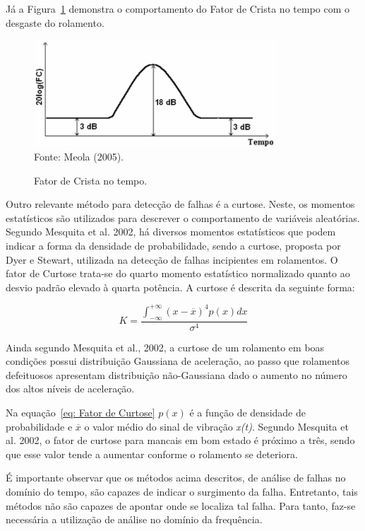 \documentclass[
	12pt,				
	oneside,			
	a4paper,			
	english,			
	brazil,	
	sumario=abnt-6027-2012		
	]{abntex2ppgsi}
\begin{document}
Já a Figura~\ref{FatorCrista} demonstra o comportamento do Fator de Crista no tempo com o desgaste do rolamento.

\begin{figure}[!htb]
\centering
\caption {Fator de Crista no tempo.}
\includegraphics[width=\textwidth,height=40mm,keepaspectratio]{Figura19} \\
Fonte: Meola (2005).
\label{FatorCrista}
\end{figure}	

Outro relevante método para detecção de falhas é a curtose. Neste, os momentos estatísticos são utilizados para descrever o comportamento de variáveis aleatórias. Segundo Mesquita et al. 2002, há diversos momentos estatísticos que podem indicar a forma da densidade de probabilidade, sendo a curtose, proposta por Dyer e Stewart, utilizada na detecção de falhas incipientes em rolamentos. O fator de Curtose trata-se do quarto momento estatístico normalizado quanto ao desvio padrão elevado à quarta potência. A curtose é descrita da seguinte forma:

\begin{equation}
	K = \frac{ \int_{-\infty}^{+\infty} (x - \overline{x})^{4}p(x)dx } {\sigma^{4}}
	\label{eq: Fator de Curtose}
\end{equation}

Ainda segundo Mesquita et al., 2002, a curtose de um rolamento em boas condições possui distribuição Gaussiana de aceleração, ao passo que rolamentos defeituosos apresentam distribuição não-Gaussiana dado o aumento no número dos altos níveis de aceleração. 

Na equação~\ref{eq: Fator de Curtose} $p(x)$ é a função de densidade de probabilidade e $\overline{x}$ o valor médio do sinal de vibração \textit{x(t)}. Segundo Mesquita et al. 2002, o fator de curtose para mancais em bom estado é próximo a três, sendo que esse valor tende a aumentar conforme o rolamento se deteriora. 

É importante observar que os métodos acima descritos, de análise de falhas no domínio do tempo, são capazes de indicar o surgimento da falha. Entretanto, tais métodos não são capazes de apontar onde se localiza tal falha. Para tanto, faz-se necessária a utilização de análise no domínio da frequência. 
\end{document}

